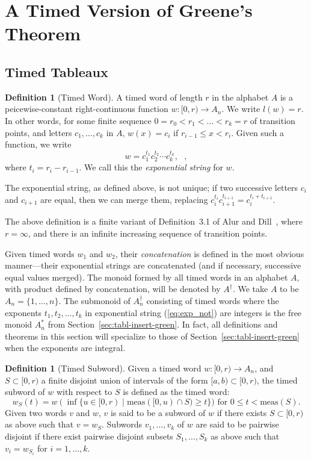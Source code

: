 \documentclass[10pt]{amsproc}
\theoremstyle{definition}
\newtheorem{definition}[theorem]{Definition}
\theoremstyle{remark}
\begin{document}
\section{A Timed Version of Greene's Theorem}
\label{sec:timed-vers-green}
\subsection{Timed Tableaux}
\label{sec:timed-tableaux}
\begin{definition}
  [Timed Word]
  \label{definition:timed-word}
  A timed word of length $r$ in the alphabet $A$ is a peicewise-constant right-continuous function $w:[0,r)\to A_n$.
  We write $l(w)=r$.
  In other words, for some finite sequence $0=r_0<r_1<\dotsc<r_k=r$ of transition points, and letters $c_1,\dotsc, c_k$ in $A$, $w(x) = c_i$ if $r_{i-1}\leq x < r_i$.
  Given such a function, we write
  \begin{equation}
    \label{eq:exp_not}
    w = c_1^{t_1} c_2^{t_2}\dotsb c_k^{t_k}, \text{ },
  \end{equation}
  where $t_i = r_i-r_{i-1}$.
  We call this the \emph{exponential string} for $w$.
\end{definition}
The exponential string, as defined above, is not unique; if two successive letters $c_i$ and $c_{i+1}$ are equal, then we can merge them, replacing $c_i^{t_i}c_{i+1}^{t_{i+1}} = c_i^{t_i+t_{i+1}}$.

The above definition is a finite variant of Definition~3.1 of Alur and Dill~\cite{alur-dill}, where $r=\infty$, and there is an infinite increasing sequence of transition points.

Given timed words $w_1$ and $w_2$, their \emph{concatenation} is defined in the most obvious manner---their exponential strings are concatenated (and if necessary, successive equal values merged).
The monoid formed by all timed words in an alphabet $A$, with product defined by concatenation, will be denoted by $A^\dagger$.
We take $A$ to be $A_n=\{1,\dotsc,n\}$.
The submonoid of $A_n^\dagger$ consisting of timed words where the exponents $t_1,t_2,\dotsc,t_k$ in exponential string (\ref{eq:exp_not}) are integers is the free monoid $A_n^*$ from Section~\ref{sec:tabl-insert-green}.
In fact, all definitions and theorems in this section will specialize to those of Section~\ref{sec:tabl-insert-green} when the exponents are integral.

\begin{definition}
  [Timed Subword]
  Given a timed word $w:[0,r)\to A_n$, and $S\subset [0,r)$ a finite disjoint union of intervals of the form $[a, b)\subset [0,r)$, the timed subword of $w$ with respect to $S$ is defined as the timed word:
  \begin{displaymath}
    w_S(t) = w(\inf\{u\in [0,r)\mid \mathrm{meas}([0,u)\cap S) \geq t\}) \text{ for } 0\leq t < \mathrm{meas}(S).
  \end{displaymath}
  Given two words $v$ and $w$, $v$ is said to be a subword of $w$ if there exists $S\subset [0,r)$ as above such that $v=w_S$.
  Subwords $v_1,\dotsc,v_k$ of $w$ are said to be pairwise disjoint if there exist pairwise disjoint subsets $S_1,\dotsc,S_k$ as above such that $v_i=w_{S_i}$ for $i=1,\dotsc,k$.
\end{definition}
\end{document}
